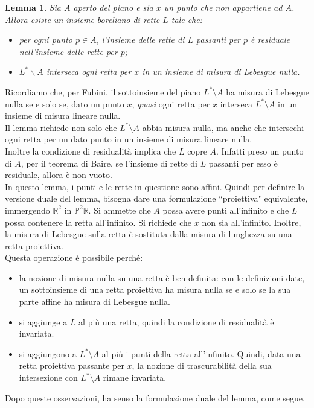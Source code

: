 \documentclass[a4paper, twoside]{article}
\newcommand{\R}{\mathbb{R}}
\renewcommand{\P}{\mathbb{P}}
\newcommand{\<}{\langle}
\renewcommand{\>}{\rangle}
\newtheorem{lemma}[teo]{Lemma}
\begin{document}
\begin{lemma} \label{lemma1}
Sia $A$ aperto del piano e sia $x$ un punto che non appartiene ad $A$. Allora esiste un insieme boreliano di rette $L$ tale che:
\begin{itemize}
	\item per ogni punto $p \in A$, l'insieme delle rette di $L$ passanti per $p$ è residuale nell'insieme delle rette per $p$;
	\item $L^{*} \backslash A$ interseca ogni retta per $x$ in un insieme di misura di Lebesgue nulla.
\end{itemize}
\end{lemma}

Ricordiamo che, per Fubini, il sottoinsieme del piano $L^* \setminus A$ ha misura di Lebesgue nulla se e solo se, dato un punto $x$, \emph{quasi} ogni retta per $x$ interseca $L^* \setminus A$ in un insieme di misura lineare nulla.\\
Il lemma richiede non solo che $L^* \setminus A$ abbia misura nulla, ma anche che intersechi ogni retta per un dato punto in un insieme di misura lineare nulla. \\
Inoltre la condizione di residualità implica che $L$ copre $A$. Infatti preso un punto di $A$, per il teorema di Baire, se l'insieme di rette di $L$ passanti per esso è residuale, allora è non vuoto.\\

In questo lemma, i punti e le rette in questione sono affini. Quindi per definire la versione duale del lemma, bisogna dare una formulazione ``proiettiva" equivalente, immergendo $\R^2$ in $\P^2\R$. Si ammette che $A$ possa avere punti all'infinito e che $L$ possa contenere la retta all'infinito. Si richiede che $x$ non sia all'infinito. Inoltre, la misura di Lebesgue sulla retta è sostituta dalla misura di lunghezza su una retta proiettiva.\\
Questa operazione è possibile perché:
\begin{itemize}
	\item la nozione di misura nulla su una retta è ben definita: con le definizioni date, un sottoinsieme di una retta proiettiva ha misura nulla se e solo se la sua parte affine ha misura di Lebesgue nulla. 
	\item si aggiunge a $L$ al più una retta, quindi la condizione di residualità è invariata.
	\item si aggiungono a $L^* \setminus A$ al più i punti della retta all'infinito. Quindi, data una retta proiettiva passante per $x$, la nozione di trascurabilità della sua intersezione con $L^* \setminus A$ rimane invariata.
\end{itemize}
Dopo queste osservazioni, ha senso la formulazione duale del lemma, come segue. 
\end{document}
